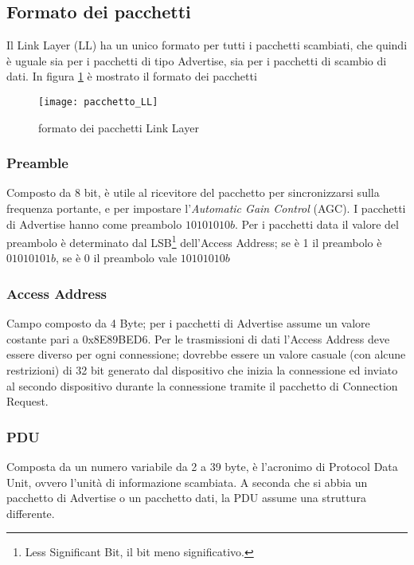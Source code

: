 \subsection{Formato dei pacchetti}

Il Link Layer (LL) ha un unico formato per tutti i pacchetti scambiati, che quindi è uguale sia per i pacchetti di tipo Advertise, sia per i pacchetti di scambio di dati.
In figura \ref{pacchetto_LL} è mostrato il formato dei pacchetti

\begin{figure}[H]
\texttt{[image: pacchetto\_LL]}
\centering
\caption{formato dei pacchetti Link Layer}
\label{pacchetto_LL}
\end{figure}

\subsubsection{Preamble}
Composto da 8 bit, è utile al ricevitore del pacchetto per sincronizzarsi sulla frequenza portante, e per impostare l'\emph{Automatic Gain Control} (AGC).
I pacchetti di Advertise hanno come preambolo $10101010b$. Per i pacchetti data il valore del preambolo è determinato dal LSB\footnote{Less Significant Bit, il bit meno significativo.} dell'Access Address; se è 1 il preambolo è $01010101b$, se è 0 il preambolo vale $10101010b$

\subsubsection{Access Address}
Campo composto da 4 Byte; per i pacchetti di Advertise assume un valore costante pari a 0x8E89BED6. Per le trasmissioni di dati l'Access Address deve essere diverso per ogni connessione; dovrebbe essere un valore casuale (con alcune restrizioni) di 32 bit generato dal dispositivo che inizia la connessione ed inviato al secondo dispositivo durante la connessione tramite il pacchetto di Connection Request. 

\subsubsection{PDU}
Composta da un numero variabile da 2 a 39 byte, è l'acronimo di Protocol Data Unit, ovvero l'unità di informazione scambiata. A seconda che si abbia un pacchetto di Advertise o un pacchetto dati, la PDU assume una struttura differente.


